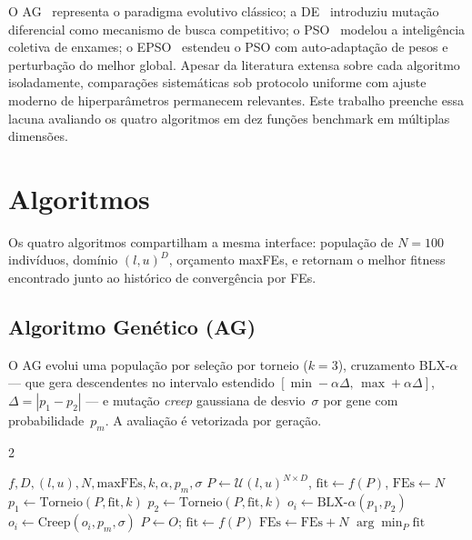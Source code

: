 \documentclass[runningheads]{llncs}
\begin{document}
O AG~\cite{goldberg1989} representa o paradigma evolutivo clássico; a
DE~\cite{storn1997} introduziu mutação diferencial como mecanismo de busca
competitivo; o PSO~\cite{kennedy1995} modelou a inteligência coletiva de
enxames; o EPSO~\cite{miranda2002} estendeu o PSO com auto-adaptação
de pesos e perturbação do melhor global. Apesar da literatura extensa
sobre cada algoritmo isoladamente, comparações sistemáticas sob protocolo
uniforme com ajuste moderno de hiperparâmetros permanecem relevantes.
Este trabalho preenche essa lacuna avaliando os quatro algoritmos em
dez funções benchmark em múltiplas dimensões.

\section{Algoritmos}
\label{sec:algoritmos}

Os quatro algoritmos compartilham a mesma interface: população de
$N=100$ indivíduos, domínio $(l,u)^D$, orçamento maxFEs, e retornam
o melhor fitness encontrado junto ao histórico de convergência por FEs.

\subsection{Algoritmo Genético (AG)}

O AG evolui uma população por seleção por torneio ($k=3$), cruzamento
BLX-$\alpha$ — que gera descendentes no intervalo estendido
$[\min-\alpha\Delta,\,\max+\alpha\Delta]$, $\Delta=|p_1-p_2|$ —
e mutação \emph{creep} gaussiana de desvio~$\sigma$ por gene com
probabilidade~$p_m$. A avaliação é vetorizada por geração.

\begin{algorithm}[H]
\caption{Algoritmo Genético (AG)}\label{alg:ag}
\begin{multicols}{2}
\begin{algorithmic}[1]
\footnotesize
\Require $f,D,(l,u),N,\text{maxFEs},k,\alpha,p_m,\sigma$
\State $P\!\leftarrow\!\mathcal{U}(l,u)^{N\times D}$,
       $\text{fit}\!\leftarrow\!f(P)$,
       $\text{FEs}\!\leftarrow\!N$
    \State $p_1\!\leftarrow\!\text{Torneio}(P,\text{fit},k)$
    \State $p_2\!\leftarrow\!\text{Torneio}(P,\text{fit},k)$
    \State $o_i\!\leftarrow\!\text{BLX-}\alpha(p_1,p_2)$
    \State $o_i\!\leftarrow\!\text{Creep}(o_i,p_m,\sigma)$
  \EndFor
  \State $P\!\leftarrow\!O$;
         $\text{fit}\!\leftarrow\!f(P)$
  \State $\text{FEs}\!\leftarrow\!\text{FEs}+N$
\EndWhile
\State \Return $\arg\min_P \text{fit}$
\end{algorithmic}
\end{multicols}
\end{algorithm}
\end{document}
